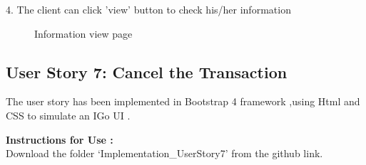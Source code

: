 \documentclass[12pt]{report}
\begin{document}
4.	The client can click 'view' button to check his/her information
\begin{figure}[H]
	\caption{\label{fig:6_view}Information view page}	
\end{figure}



\FloatBarrier
\subsection{User Story 7: Cancel the Transaction}

The user story has been implemented in Bootstrap 4 framework ,using  Html and CSS to simulate an IGo UI .

\textbf{Instructions for Use :} \\
Download the folder ‘Implementation\_UserStory7’ from the github link.
\end{document}
